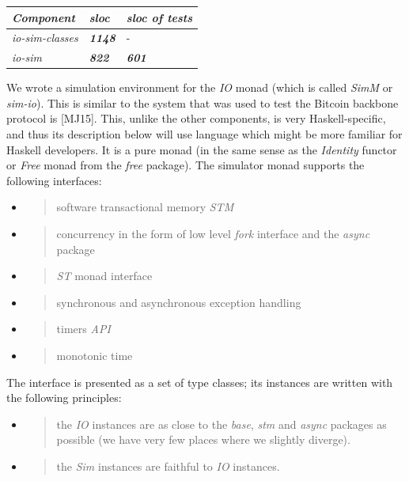 \documentclass[11pt,a4paper]{article}
\begin{document}
\begin{longtable}[]{@{}lll@{}}
\toprule
\emph{Component} & \emph{sloc} & \emph{sloc of tests}\tabularnewline
\midrule
\endhead
\emph{io-sim-classes} & \emph{\textbf{1148}} & -\tabularnewline
\emph{io-sim} & \emph{\textbf{822}} & \emph{\textbf{601}}\tabularnewline
\bottomrule
\end{longtable}

We wrote a simulation environment for the \emph{IO} monad (which is
called \emph{SimM} or \emph{sim-io}). This is similar to the system that
was used to test the Bitcoin backbone protocol is {[}MJ15{]}. This,
unlike the other components, is very Haskell-specific, and thus its
description below will use language which might be more familiar for
Haskell developers. It is a pure monad (in the same sense as the
\emph{Identity} functor or \emph{Free} monad from the \emph{free}
package). The simulator monad supports the following interfaces:

\begin{itemize}
\item
  \begin{quote}
  software transactional memory \emph{STM}
  \end{quote}
\item
  \begin{quote}
  concurrency in the form of low level \emph{fork} interface and the
  \emph{async} package
  \end{quote}
\item
  \begin{quote}
  \emph{ST} monad interface
  \end{quote}
\item
  \begin{quote}
  synchronous and asynchronous exception handling
  \end{quote}
\item
  \begin{quote}
  timers \emph{API}
  \end{quote}
\item
  \begin{quote}
  monotonic time
  \end{quote}
\end{itemize}

The interface is presented as a set of type classes; its instances are
written with the following principles:

\begin{itemize}
\item
  \begin{quote}
  the \emph{IO} instances are as close to the \emph{base}, \emph{stm}
  and \emph{async} packages as possible (we have very few places where
  we slightly diverge).
  \end{quote}
\item
  \begin{quote}
  the \emph{Sim} instances are faithful to \emph{IO} instances.
  \end{quote}
\end{itemize}
\end{document}
